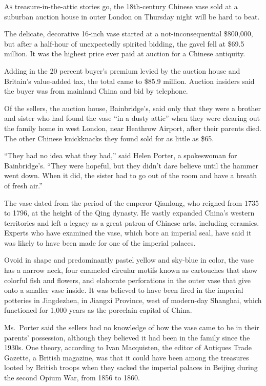﻿\documentclass[12pt]{article}
\begin{document}
\lettrine{A}{s} treasure-in-the-attic stories go, the 18th-century Chinese
vase sold at a suburban auction house in outer London on Thursday night will be hard to beat.

The delicate, decorative 16-inch vase started at a not-inconsequential \$800,000, but after a
half-hour of unexpectedly spirited bidding, the gavel fell at \$69.5 million. It was the highest
price ever paid at auction for a Chinese antiquity.

Adding in the 20 percent buyer's premium levied by the auction house and Britain's value-added tax,
the total came to \$85.9 million. Auction insiders said the buyer was from mainland China and bid by
telephone.

Of the sellers, the auction house, Bainbridge's, said only that they were a brother and sister who
had found the vase ``in a dusty attic'' when they were clearing out the family home in west London,
near Heathrow Airport, after their parents died. The other Chinese knickknacks they found sold for
as little as \$65.

``They had no idea what they had,'' said Helen Porter, a spokeswoman for Bainbridge's. ``They were
hopeful, but they didn't dare believe until the hammer went down. When it did, the sister had to go
out of the room and have a breath of fresh air.''

The vase dated from the period of the emperor Qianlong, who reigned from 1735 to 1796, at the height
of the Qing dynasty. He vastly expanded China's western territories and left a legacy as a great
patron of Chinese arts, including ceramics. Experts who have examined the vase, which bore an
imperial seal, have said it was likely to have been made for one of the imperial palaces.

Ovoid in shape and predominantly pastel yellow and sky-blue in color, the vase has a narrow neck,
four enameled circular motifs known as cartouches that show colorful fish and flowers, and elaborate
perforations in the outer vase that give onto a smaller vase inside. It was believed to have been
fired in the imperial potteries in Jingdezhen, in Jiangxi Province, west of modern-day Shanghai,
which functioned for 1,000 years as the porcelain capital of China.

Ms.~Porter said the sellers had no knowledge of how the vase came to be in their parents'
possession, although they believed it had been in the family since the 1930s. One theory, according
to Ivan Macquisten, the editor of Antiques Trade Gazette, a British magazine, was that it could have
been among the treasures looted by British troops when they sacked the imperial palaces in Beijing
during the second Opium War, from 1856 to 1860.
\end{document}
